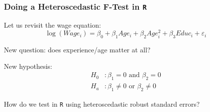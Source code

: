\begin{frame}[fragile]\frametitle{Doing a Heteroscedastic F-Test in \texttt{R}}
	Let us revisit the wage equation:
	\[
		\log(Wage_i) = \beta_0 + \beta_1 Age_i + \beta_2 Age_i^2 + \beta_3 Educ_i + \varepsilon_i
	\]
	
	\begin{itemize}{\small 
		\item New question: does experience/age matter at all?
		\item New hypothesis:
			\begin{align*}
				H_0&: \beta_1 = 0\text{ and } \beta_2=0\\
				H_a&: \beta_1 \ne 0\text{ or } \beta_2\ne 0
			\end{align*}
		\item How do we test in \texttt{R} using heteroscedastic robust standard errors?}
	\end{itemize}

\vspace{5mm}

\end{frame}





